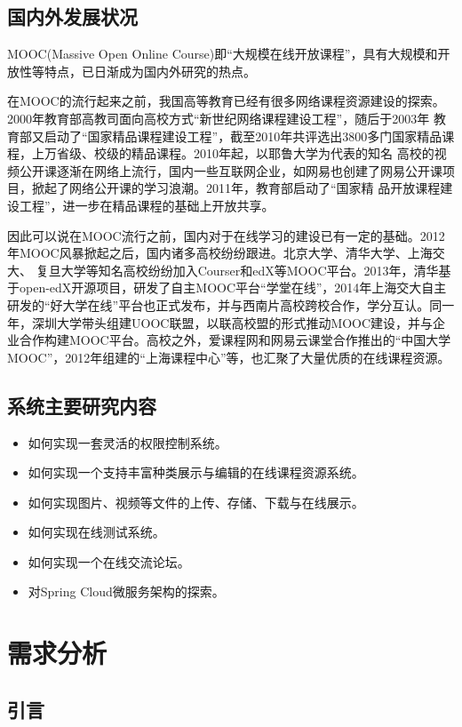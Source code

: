 \documentclass[titlepage,UTF8,linespread=1.5]{ctexart}
\begin{document}
\subsection{国内外发展状况}
MOOC(Massive Open Online Course)即“大规模在线开放课程”，具有大规模和开放性等特点，已日渐成为国内外研究的热点。\par
在MOOC的流行起来之前，我国高等教育已经有很多网络课程资源建设的探索。2000年教育部高教司面向高校方式“新世纪网络课程建设工程”，随后于2003年
教育部又启动了“国家精品课程建设工程”，截至2010年共评选出3800多门国家精品课程，上万省级、校级的精品课程。2010年起，以耶鲁大学为代表的知名
高校的视频公开课逐渐在网络上流行，国内一些互联网企业，如网易也创建了网易公开课项目，掀起了网络公开课的学习浪潮。2011年，教育部启动了“国家精
品开放课程建设工程”，进一步在精品课程的基础上开放共享。\par
因此可以说在MOOC流行之前，国内对于在线学习的建设已有一定的基础。2012年MOOC风暴掀起之后，国内诸多高校纷纷跟进。北京大学、清华大学、上海交大、
复旦大学等知名高校纷纷加入Courser和edX等MOOC平台。2013年，清华基于open-edX开源项目，研发了自主MOOC平台“学堂在线”，2014年上海交大自主
研发的“好大学在线”平台也正式发布，并与西南片高校跨校合作，学分互认。同一年，深圳大学带头组建UOOC联盟，以联高校盟的形式推动MOOC建设，并与企
业合作构建MOOC平台。高校之外，爱课程网和网易云课堂合作推出的“中国大学MOOC”，2012年组建的“上海课程中心”等，也汇聚了大量优质的在线课程资源。\par
\subsection{系统主要研究内容}
\begin{itemize}
    \item 如何实现一套灵活的权限控制系统。
    \item 如何实现一个支持丰富种类展示与编辑的在线课程资源系统。
    \item 如何实现图片、视频等文件的上传、存储、下载与在线展示。
    \item 如何实现在线测试系统。
    \item 如何实现一个在线交流论坛。
    \item 对Spring Cloud微服务架构的探索。
\end{itemize}
\clearpage

\section{需求分析}
\subsection{引言}
\end{document}
